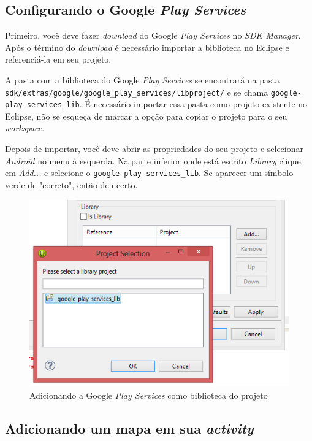 \documentclass[a4paper,12pt,brazil,oneside]{book}
\begin{document}
\begin{singlespace}
		\subsection{Configurando o Google  \emph{Play Services}}

		Primeiro, você deve fazer \emph{download} do Google \emph{Play Services} no \emph{SDK Manager}. Após o término do \emph{download} é necessário importar a biblioteca no Eclipse e referenciá-la em seu projeto. 
		
		A pasta com a biblioteca do Google \emph{Play Services} se encontrará na pasta \\ \texttt{sdk/extras/google/google\_play\_services/libproject/} e se chama \texttt{google-play-services\_lib}. É necessário importar essa pasta como projeto existente no Eclipse, não se esqueça de marcar a opção para copiar o projeto para o seu \emph{workspace}. 

		Depois de importar, você deve abrir as propriedades do seu projeto e selecionar \emph{Android} no menu à esquerda. Na parte inferior onde está escrito \emph{Library} clique em \emph{Add...} e selecione o \texttt{google-play-services\_lib}. Se aparecer um símbolo verde de "correto", então deu certo.

		\begin{figure}[H]
		  \centering
		  \includegraphics[width=.8\textwidth]{figuras/api/localizacao/playlib.png}
		  \caption{Adicionando a Google \emph{Play Services} como biblioteca do projeto}
		  \label{fig:apiplaylib}
		\end{figure}

		\subsection{Adicionando um mapa em sua \emph{activity}}


\end{singlespace}
\end{document}
